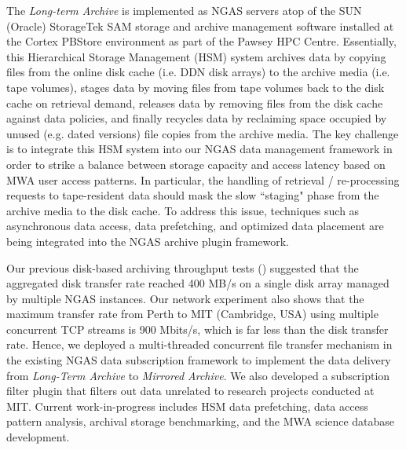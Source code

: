 The \emph{Long-term Archive} is implemented as NGAS servers atop of the SUN (Oracle) StorageTek SAM storage and archive management software installed at the Cortex PBStore environment as part of the Pawsey HPC Centre. Essentially, this Hierarchical Storage Management (HSM) system archives data by copying files from the online disk cache (i.e. DDN disk arrays) to the archive media (i.e. tape volumes), stages data by moving files from tape volumes back to the disk cache on retrieval demand, releases data by removing files from the disk cache against data policies, and finally recycles data by reclaiming space occupied by unused (e.g. dated versions) file copies from the archive media. The key challenge is to integrate this HSM system into our NGAS data management framework in order to strike a balance between storage capacity and access latency based on MWA user access patterns. In particular, the handling of retrieval / re-processing requests to tape-resident data should mask the slow ``staging" phase from the archive media to the disk cache. To address this issue, techniques such as asynchronous data access, data prefetching, and optimized data placement are being integrated into the NGAS archive plugin framework.  

Our previous disk-based archiving throughput tests (\cite{wiceneca2012mwa}) suggested that the aggregated disk transfer rate reached 400 MB/s on a single disk array managed by multiple NGAS instances. Our network experiment also shows that the maximum transfer rate from Perth to MIT (Cambridge, USA) using multiple concurrent TCP streams is 900 Mbits/s, which is far less than the disk transfer rate. Hence, we deployed a multi-threaded concurrent file transfer mechanism in the existing NGAS data subscription framework to implement the data delivery from \emph{Long-Term Archive} to \emph{Mirrored Archive}. We also developed a subscription filter plugin that filters out data unrelated to research projects conducted at MIT. Current work-in-progress includes HSM data prefetching, data access pattern analysis, archival storage benchmarking, and the MWA science database development.


